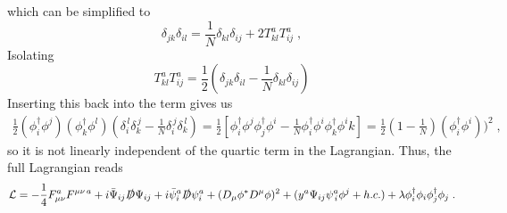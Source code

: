 which can be simplified to 
\begin{equation}
      \delta_{jk}\delta_{il}=\frac{1}{N} \delta_{kl}\delta_{ij}+2T^a_{kl}T^a_{ij}\;,
\end{equation}
Isolating 
\begin{equation}
      T^a_{kl}T^a_{ij}=\frac{1}{2}\left(\delta_{jk}\delta_{il}-\frac{1}{N} \delta_{kl}\delta_{ij}\right)
\end{equation}
Inserting this back into the term gives us
\begin{align}
    \frac{1}{2} (\phi_i^\dagger \phi^j)(\phi_k^\dagger \phi^l)\left(\delta_i^{\,l}\delta_k^{\,j}-\frac{1}{N}\delta_i^{\,j}\delta_k^{\,l}\right)=\frac{1}{2}\left[\phi^{\dagger}_i \phi^j \phi^{\dagger}_j \phi^i-\frac{1}{N}\phi^{\dagger}_i \phi^i \phi^{\dagger}_k \phi^ik\right]=\frac{1}{2}\left(1-\frac{1}{N}\right) (\phi^{\dagger}_i \phi^i))^2\;,
\end{align}
so it is not linearly independent of the quartic term in the Lagrangian. Thus, the full Lagrangian reads
\begin{equation}
    \mathcal{L}= -\frac{1}{4} F_{\mu\nu}^a F^{\mu\nu\,a}+i \bar \Psi_{ij}\slashed{D}\Psi_{ij}+i \bar \psi_i^a\slashed{D}\psi_i^a+(D_\mu \phi^*D^\mu\phi)^2+(y^a\Psi_{ij} \psi ^a_{\, i} \phi^j + h.c.)+\lambda \phi^\dagger_i \phi_i \phi^\dagger_j \phi_j 
    \;.
\end{equation}

